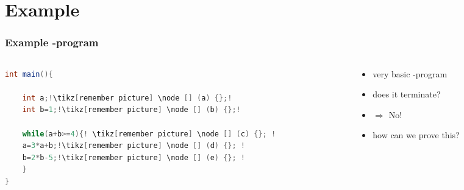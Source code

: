\section{Example}

\begin{frame}[fragile] %
  \frametitle{Example -program} %
  \begin{columns}
  	\begin{column}{6cm}
  		\begin{lstlisting}[language = java,escapechar = !]
int main(){
  		
	int a;!\tikz[remember picture] \node [] (a) {};!
	int b=1;!\tikz[remember picture] \node [] (b) {};!
  		
	while(a+b>=4){! \tikz[remember picture] \node [] (c) {}; !
    a=3*a+b;!\tikz[remember picture] \node [] (d) {}; !
    b=2*b-5;!\tikz[remember picture] \node [] (e) {}; !
	}
}		
  		\end{lstlisting}
%  		
%  		
  	\end{column}
	\begin{column}{5cm}
		\begin{itemize}			
			\item very basic -program
			\item does it terminate?
			\item[] $\Rightarrow$ \color{red}No!\color{black}
			\item[] how can we prove this?
		\end{itemize}
	\end{column}
  \end{columns}
\end{frame}